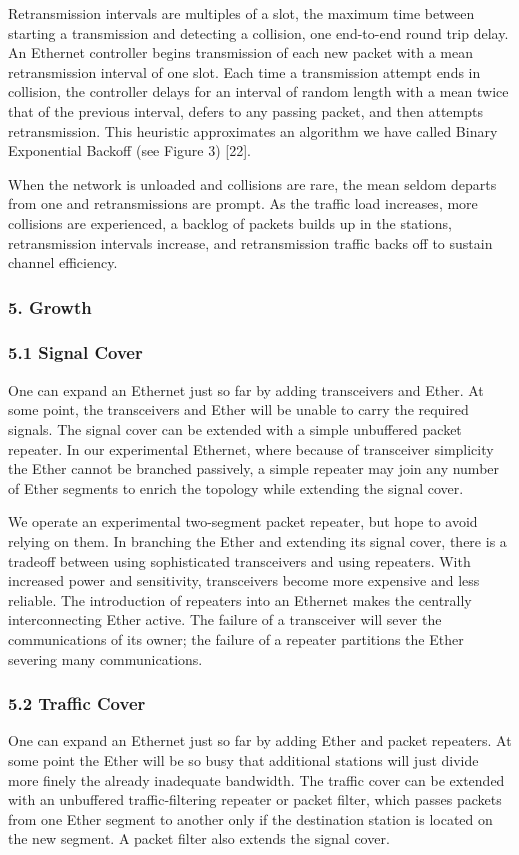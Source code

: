Retransmission intervals are multiples of a slot, the maximum time between starting a transmission and detecting a collision, one end-to-end round trip delay. An Ethernet controller begins transmission of each new packet with a mean retransmission interval of one slot. Each time a transmission attempt ends in collision, the controller delays for an interval of random length with a mean twice that of the previous interval, defers to any passing packet, and then attempts retransmission. This heuristic approximates an algorithm we have called Binary Exponential Backoff (see Figure 3) [22].

When the network is unloaded and collisions are rare, the mean seldom departs from one and retransmissions are prompt. As the traffic load increases, more collisions are experienced, a backlog of packets builds up in the stations, retransmission intervals increase, and retransmission traffic backs off to sustain channel efficiency.

\subsubsection*{5. Growth}

\subsubsection{5.1 Signal Cover}
One can expand an Ethernet just so far by adding transceivers and Ether. At some point, the transceivers and Ether will be unable to carry the required signals. The signal cover can be extended with a simple unbuffered packet repeater. In our experimental Ethernet, where because of transceiver simplicity the Ether cannot be branched passively, a simple repeater may join any number of Ether segments to enrich the topology while extending the signal cover.

We operate an experimental two-segment packet repeater, but hope to avoid relying on them. In branching the Ether and extending its signal cover, there is a tradeoff between using sophisticated transceivers and using repeaters. With increased power and sensitivity, transceivers become more expensive and less reliable. The introduction of repeaters into an Ethernet makes the centrally interconnecting Ether active. The failure of a transceiver will sever the communications of its owner; the failure of a repeater partitions the Ether severing many communications.

\subsubsection{5.2 Traffic Cover}
One can expand an Ethernet just so far by adding Ether and packet repeaters. At some point the Ether will be so busy that additional stations will just divide more finely the already inadequate bandwidth. The traffic cover can be extended with an unbuffered traffic-filtering repeater or packet filter, which passes packets from one Ether segment to another only if the destination station is located on the new segment. A packet filter also extends the signal cover.


